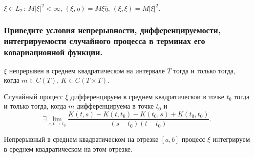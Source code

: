 $ \xi \in L_2 \, : \, M \left| \xi \right|^2 < \infty, \,
  \left( \xi, \eta \right) = M \xi \overline{ \eta }, \,
  \left( \xi, \xi \right) = M \left| \xi \right|^2$.

\subsubsection*{Приведите условия непрерывности, дифференцируемости,
                интегрируемости случайного процесса в терминах его ковариационной функции.}

$ \xi $ непрерывен в среднем квадратическом на интервале $T$ тогда и только тогда,
когда $m \in C \left( T \right), \, K \in C \left( T \times T \right) $.

Случайный процесс $ \xi $ дифференцируем в среднем квадратическои в точке $t_0$
тогда и только тогда, когда $m$ дифференцируема в точке $t_0$ и
$$ \exists \lim \limits_{s, t \to t_0}
    \frac{K \left( t, s \right) - K \left( t, t_0 \right) - K \left( t_0, s \right) + K \left( t_0, t_0 \right) }{ \left( s - t_0 \right) \left( t - t_0 \right) }.$$

Непрерывный в среднем квадратическом на отрезке $ \left[ a, b \right] $ процесс $ \xi $
интегрируем в среднем квадратическом на этом отрезке.
